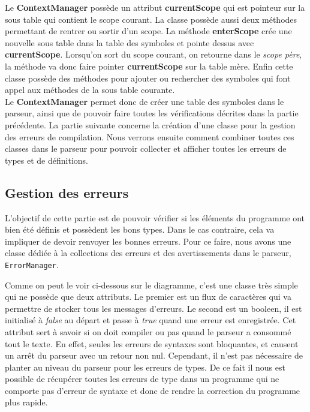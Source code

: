 \documentclass[a4paper]{article}%
\begin{document}
Le \textbf{ContextManager} possède un attribut \textbf{currentScope} qui est pointeur sur
la sous table qui contient le scope courant. La classe possède aussi deux
méthodes permettant de rentrer ou sortir d'un scope. La méthode
\textbf{enterScope} crée une nouvelle sous table dans la table des symboles et
pointe dessus avec \textbf{currentScope}. Lorsqu'on sort du scope courant, on
retourne dans le \textit{scope père}, la méthode va donc faire pointer
\textbf{currentScope} sur la table mère. Enfin cette classe possède des méthodes
pour ajouter ou rechercher des symboles qui font appel aux méthodes de la sous
table courante.\\

Le \textbf{ContextManager} permet donc de créer une table des symboles dans le
parseur, ainsi que de pouvoir faire toutes les vérifications décrites dans la
partie précédente. La partie suivante concerne la création d'une classe pour la
gestion des erreurs de compilation. Nous verrons ensuite comment combiner toutes
ces classes dans le parseur pour pouvoir collecter et afficher toutes les
erreurs de types et de définitions.

\subsection{Gestion des erreurs}

L'objectif de cette partie est de pouvoir vérifier si les éléments du programme
ont bien été définis et possèdent les bons types. Dans le cas contraire, cela va
impliquer de devoir renvoyer les bonnes erreurs. Pour ce faire, nous avons une
classe dédiée à la collections des erreurs et des avertissements dans le
parseur, \lstinline{ErrorManager}.

Comme on peut le voir ci-dessous sur le diagramme, c'est une classe très simple
qui ne possède que deux attributs. Le premier est un flux de caractères qui va
permettre de stocker tous les messages d'erreurs. Le second est un booleen, il
est initialisé à \textit{false} au départ et passe à \textit{true} quand une
erreur est enregistrée. Cet attribut sert à savoir si on doit compiler ou pas
quand le parseur a consommé tout le texte. En effet, seules les erreurs de
syntaxes sont bloquantes, et causent un arrêt du parseur avec un retour non nul.
Cependant, il n'est pas nécessaire de planter au niveau du parseur pour les
erreurs de types. De ce fait il nous est possible de récupérer toutes les
erreurs de type dans un programme qui ne comporte pas d'erreur de syntaxe et
donc de rendre la correction du programme plus rapide.
\end{document}

